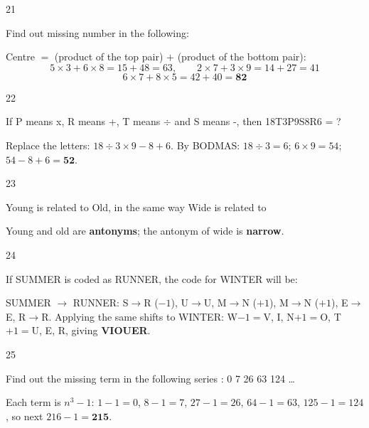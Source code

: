 \begin{question}{21}
{Find out missing number in the following:\par}
\begin{explain}
Centre $=$ (product of the top pair) $+$ (product of the bottom pair):
\[5\times3+6\times8=15+48=63,\qquad 2\times7+3\times9=14+27=41\]
\[6\times7+8\times5=42+40=\mathbf{82}\]
\end{explain}
\end{question}

\begin{question}{22}
{If P means x, R means +, T means $\div$ and S means -, then 18T3P9S8R6 = ?\par}
\begin{explain}
Replace the letters: $18\div3\times9-8+6$.
By BODMAS: $18\div3=6$; $6\times9=54$; $54-8+6=\mathbf{52}$.
\end{explain}
\end{question}

\begin{question}{23}
{Young is related to Old, in the same way Wide is related to\par}
\begin{explain}
Young and old are \textbf{antonyms}; the antonym of wide is \textbf{narrow}.
\end{explain}
\end{question}

\begin{question}{24}
{If SUMMER is coded as RUNNER, the code for WINTER will be:\par}
\begin{explain}
SUMMER $\rightarrow$ RUNNER: S$\rightarrow$R ($-1$), U$\rightarrow$U, M$\rightarrow$N ($+1$), M$\rightarrow$N ($+1$), E$\rightarrow$E, R$\rightarrow$R.
Applying the same shifts to WINTER: W$-1=$V, I, N$+1=$O, T$+1=$U, E, R, giving \textbf{VIOUER}.
\end{explain}
\end{question}

\begin{question}{25}
{Find out the missing term in the following series : 0 7 26 63 124 \ldots{}\par}
\begin{explain}
Each term is $n^3-1$: $1-1=0$, $8-1=7$, $27-1=26$, $64-1=63$, $125-1=124$, so next $216-1=\mathbf{215}$.
\end{explain}
\end{question}

